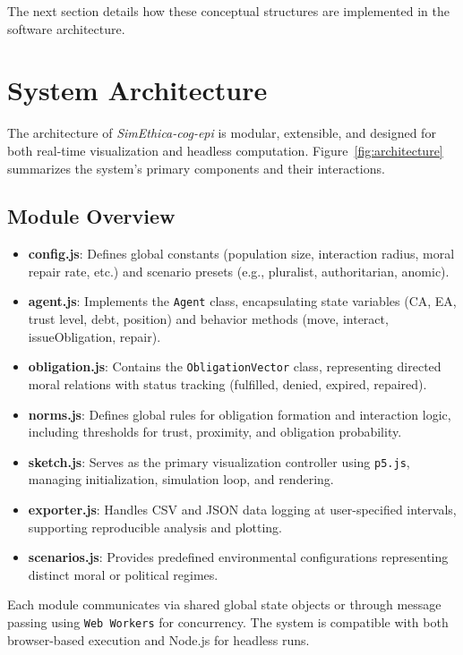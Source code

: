 \documentclass[11pt]{article}
\begin{document}
\vspace{1em}
\noindent
The next section details how these conceptual structures are implemented in the software architecture.


\section{System Architecture}

The architecture of \textit{SimEthica-cog-epi} is modular, extensible, and designed for both real-time visualization and headless computation. Figure~\ref{fig:architecture} summarizes the system’s primary components and their interactions.

\subsection{Module Overview}

\begin{itemize}
  \item \textbf{config.js}: Defines global constants (population size, interaction radius, moral repair rate, etc.) and scenario presets (e.g., pluralist, authoritarian, anomic).
  \item \textbf{agent.js}: Implements the \texttt{Agent} class, encapsulating state variables (CA, EA, trust level, debt, position) and behavior methods (move, interact, issueObligation, repair).
  \item \textbf{obligation.js}: Contains the \texttt{ObligationVector} class, representing directed moral relations with status tracking (fulfilled, denied, expired, repaired).
  \item \textbf{norms.js}: Defines global rules for obligation formation and interaction logic, including thresholds for trust, proximity, and obligation probability.
  \item \textbf{sketch.js}: Serves as the primary visualization controller using \texttt{p5.js}, managing initialization, simulation loop, and rendering.
  \item \textbf{exporter.js}: Handles CSV and JSON data logging at user-specified intervals, supporting reproducible analysis and plotting.
  \item \textbf{scenarios.js}: Provides predefined environmental configurations representing distinct moral or political regimes.
\end{itemize}

Each module communicates via shared global state objects or through message passing using \texttt{Web Workers} for concurrency. The system is compatible with both browser-based execution and Node.js for headless runs.
\end{document}
